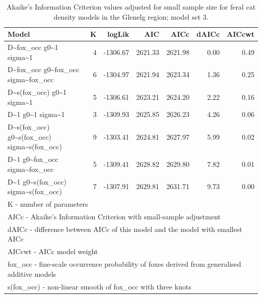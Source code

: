 \documentclass[]{elsarticle} %
\begin{document}
\begin{longtable}[t]{lrrrrrr}
\caption{\label{tab:density-aic-g-3}Akaike's Information Criterion values adjusted for small sample size for feral cat density models in the Glenelg region; model set 3.}\\
\toprule
Model & K & logLik & AIC & AICc & dAICc & AICcwt\\
\midrule
D\textasciitilde{}fox\_occ g0\textasciitilde{}1 sigma\textasciitilde{}1 & 4 & -1306.67 & 2621.33 & 2621.98 & 0.00 & 0.49\\
D\textasciitilde{}fox\_occ g0\textasciitilde{}fox\_occ sigma\textasciitilde{}fox\_occ & 6 & -1304.97 & 2621.94 & 2623.34 & 1.36 & 0.25\\
D\textasciitilde{}s(fox\_occ) g0\textasciitilde{}1 sigma\textasciitilde{}1 & 5 & -1306.61 & 2623.21 & 2624.20 & 2.22 & 0.16\\
D\textasciitilde{}1 g0\textasciitilde{}1 sigma\textasciitilde{}1 & 3 & -1309.93 & 2625.85 & 2626.23 & 4.26 & 0.06\\
D\textasciitilde{}s(fox\_occ) g0\textasciitilde{}s(fox\_occ) sigma\textasciitilde{}s(fox\_occ) & 9 & -1303.41 & 2624.81 & 2627.97 & 5.99 & 0.02\\
\addlinespace
D\textasciitilde{}1 g0\textasciitilde{}fox\_occ sigma\textasciitilde{}fox\_occ & 5 & -1309.41 & 2628.82 & 2629.80 & 7.82 & 0.01\\
D\textasciitilde{}1 g0\textasciitilde{}s(fox\_occ) sigma\textasciitilde{}s(fox\_occ) & 7 & -1307.91 & 2629.81 & 2631.71 & 9.73 & 0.00\\
\bottomrule
\multicolumn{7}{l}{\rule{0pt}{1em}K - number of parameters}\\
\multicolumn{7}{l}{\rule{0pt}{1em}AICc - Akaike's Information Criterion with small-sample adjustment}\\
\multicolumn{7}{l}{\rule{0pt}{1em}dAICc - difference between AICc of this model and the model with smallest AICc}\\
\multicolumn{7}{l}{\rule{0pt}{1em}AICcwt - AICc model weight}\\
\multicolumn{7}{l}{\rule{0pt}{1em}fox\_occ - fine-scale occurrence probability of foxes derived from generalised additive models}\\
\multicolumn{7}{l}{\rule{0pt}{1em}s(fox\_occ) - non-linear smooth of fox\_occ with three knots}\\
\end{longtable}
\endgroup{}

\newpage

\begingroup\fontsize{10}{12}\selectfont
\end{document}
